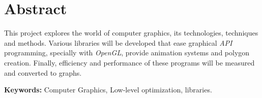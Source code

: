 \chapter*{Abstract}
This project explores the world of computer graphics, its technologies, techniques and methods. Various libraries will be developed that ease graphical \textit{API} programming, specially with \textit{OpenGL}, provide animation systems and polygon creation. Finally, efficiency and performance of these programs will be measured and converted to graphs.

\vspace{.5cm}

\textbf{Keywords:} Computer Graphics, Low-level optimization, libraries.